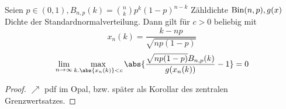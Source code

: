 \begin{proposition}
	Seien $p \in (0,1), B_{n,p}(k) = \binom{n}{k}p^k(1-p)^{n-k}$ Zähldichte $\operatorname{Bin}(n,p), g(x)$ Dichte der Standardnormalverteilung. Dann gilt für $c>0$ beliebig mit
	\[
		x_n(k) = \frac{k-np}{\sqrt{np(1-p)}}
	\]
	\begin{align*}
		\lim_{n\to \infty} \max_{k.\abs{x_n(k)} < c} \abs{\frac{\sqrt{np(1-p)}B_{n,p}(k)}{g(x_n(k))} -1} = 0
	\end{align*}
\end{proposition}
\begin{proof}
	$\nearrow$ pdf im Opal, bzw. später als Korollar des zentralen Grenzwertsatzes.
\end{proof}